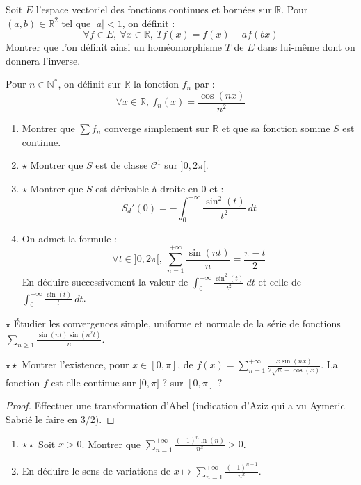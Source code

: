 \documentclass[french,a4paper]{article}
\newcommand{\N}{\mathbb{N}}
\newcommand{\R}{\mathbb{R}}
\newcommand{\st}{^*}
\theoremstyle{plain}
\theoremstyle{definition}
\theoremstyle{remark}
\begin{document}
\begin{ex}{}
	Soit $E$ l'espace vectoriel des fonctions continues et bornées sur $\R$. Pour $(a,b)\in\R^2$ tel que $\lvert a\rvert <1$, on définit : $$\forall f\in E,\ \forall x\in\R,\ Tf(x)=f(x)-af(bx)$$ Montrer que l'on définit ainsi un homéomorphisme $T$ de $E$ dans lui-même dont on donnera l'inverse.
\end{ex}

\begin{ex}{}
	Pour $n\in\N\st$, on définit sur $\R$ la fonction $f_n$ par : $$\forall x\in\R,\ f_n(x)=\frac{\cos(nx)}{n^2}$$
	\begin{enumerate}
		\item Montrer que $\sum f_n$ converge simplement sur $\R$ et que sa fonction somme $S$ est continue.
		\item $\star$ Montrer que $S$ est de classe $\mathcal{C}^1$ sur $]0,2\pi[$.
		\item $\star$ Montrer que $S$ est dérivable à droite en $0$ et : $$S_d'(0)=-\int_{0}^{+\infty}\frac{\sin^2(t)}{t^2}\ dt$$
		\item On admet la formule : $$\forall t\in]0,2\pi[,\ \sum_{n=1}^{+\infty}\frac{\sin(nt)}{n}=\frac{\pi-t}{2}$$ En déduire successivement la valeur de $\displaystyle\int_{0}^{+\infty}\frac{\sin^2(t)}{t^2}\ dt$ et celle de $\displaystyle\int_{0}^{+\infty}\frac{\sin(t)}{t}\ dt$.
	\end{enumerate}
\end{ex}

\begin{ex}{$\star$}
	Étudier les convergences simple, uniforme et normale de la série de fonctions $\displaystyle\sum_{n\geqslant 1}\frac{\sin(nt)\sin(n^2t)}{n}$.
\end{ex}

\begin{ex}{$\star\star$}
	Montrer l'existence, pour $x\in[0,\pi]$, de $f(x)=\displaystyle\sum_{n=1}^{+\infty}\frac{x\sin(nx)}{2\sqrt{n}+\cos(x)}$. La fonction $f$ est-elle continue sur $]0,\pi]$ ? sur $[0,\pi]$ ?
\end{ex}
\begin{proof}
	Effectuer une transformation d'Abel (indication d'Aziz qui a vu Aymeric Sabrié le faire en 3/2).
\end{proof}

\begin{ex}{}
	\begin{enumerate}
		\item $\star\star$ Soit $x>0$. Montrer que $\displaystyle\sum_{n=1}^{+\infty}\frac{(-1)^n\ln(n)}{n^x}>0$.
		\item En déduire le sens de variations de $x\mapsto\displaystyle\sum_{n=1}^{+\infty}\frac{(-1)^{n-1}}{n^x}$.
	\end{enumerate}
\end{ex}
\end{document}
